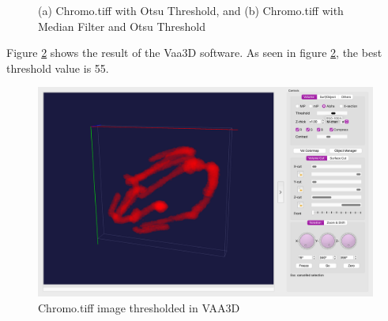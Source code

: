 \documentclass{article}
\begin{document}
\begin{figure}[h!]
\centering
{}
\caption{(a) Chromo.tiff with Otsu Threshold, and (b) Chromo.tiff with Median Filter and Otsu Threshold}
\label{fig:thresholding}
\end{figure}


Figure \ref{fig:vaa3dthresh} shows the result of the Vaa3D software. As seen in figure \ref{fig:vaa3dthresh}, the best threshold value is 55. 

\begin{figure}[h!]
    \centering
    \includegraphics[width=1\linewidth]{Report/Images/vaa3d_thresh.png}
    \caption{Chromo.tiff image thresholded in VAA3D}
    \label{fig:vaa3dthresh}
\end{figure}
\end{document}
